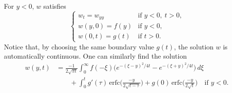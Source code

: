 \documentclass[11pt]{amsart}
\def\erfc{\mathrm{erfc}}
\begin{document}
For $y < 0$, $w$ satisfies
\[
\begin{cases}
w_t = w_{yy} & \text{if $y<0, ~t > 0$,} \\
w(y,0) = f(y) & \text{if $y < 0$,} \\
w(0,t) = g(t) & \text{if $t > 0$.}
\end{cases}
\]
Notice that, by choosing the same boundary value $g(t)$, the solution $w$ is automatically continuous. One can similarly find the solution
\[ \begin{split}
w(y,t) &= \frac{-1}{2\sqrt{\pi t}} \int_0^\infty f(-\xi) \big( e^{-(\xi-y)^2/4t} - e^{-(\xi+y)^2/4t} \big) \,d\xi \\
& \qquad + \int_0^t g'(\tau) \,\erfc\Big( \frac{-y}{2\sqrt{t-\tau}} \Big) + g(0) \,\erfc\Big( \frac{-y}{2\sqrt{t}} \Big) \quad \text{if $y < 0$.}
\end{split} \]
\end{document}
